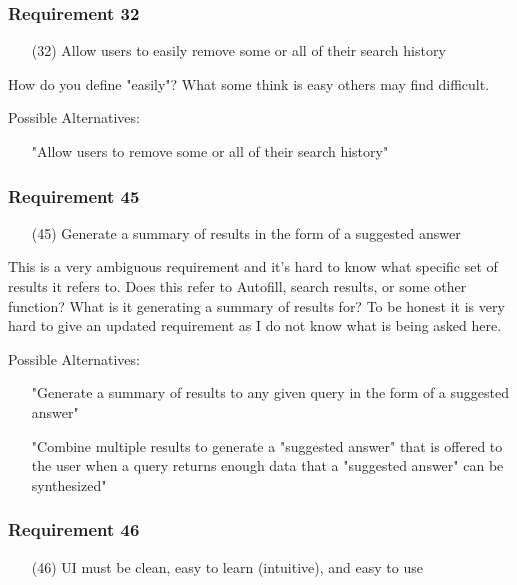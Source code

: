 \subsubsection*{Requirement 32}
\begin{itemize}
  \item[(32)] Allow users to easily remove some or all of their search history
\end{itemize}

How do you define "easily"? What some think is easy others may find difficult.

\medskip

Possible Alternatives:
\begin{itemize}
  \item[] "Allow users to remove some or all of their search history"
\end{itemize}

\subsubsection*{Requirement 45}
\begin{itemize}
  \item[(45)] Generate a summary of results in the form of a suggested answer
\end{itemize}

This is a very ambiguous requirement and it's hard to know what specific set of results it refers to. Does this refer to Autofill, search results, or some other function? What is it generating a summary of results for? To be honest it is very hard to give an updated requirement as I do not know what is being asked here. 

\medskip

Possible Alternatives:
\begin{itemize}
  \item[] "Generate a summary of results to any given query in the form of a suggested answer"
  \item[] "Combine multiple results to generate a "suggested answer" that is offered to the user when a query returns enough data that a "suggested answer" can be synthesized"
\end{itemize}

\subsubsection*{Requirement 46}
\begin{itemize}
  \item[(46)] UI must be clean, easy to learn (intuitive), and easy to use
\end{itemize}

